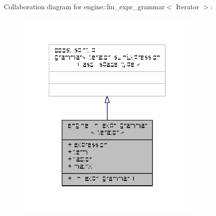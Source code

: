 Collaboration diagram for engine\-:\-:lin\-\_\-expr\-\_\-grammar$<$ Iterator $>$\-:
\nopagebreak
\begin{figure}[H]
\begin{center}
\leavevmode
\includegraphics[width=258pt]{structengine_1_1lin__expr__grammar__coll__graph}
\end{center}
\end{figure}
